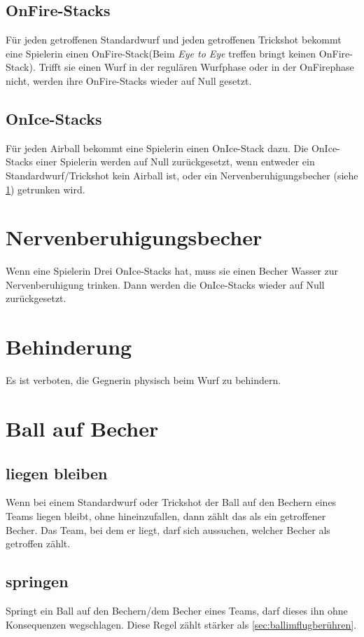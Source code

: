 \documentclass[a5paper, 12pt]{book}
\begin{document}
\subsection{OnFire-Stacks}\label{sub:onfirestacks}
Für jeden getroffenen Standardwurf und jeden getroffenen Trickshot bekommt eine Spielerin einen OnFire-Stack(Beim \textit{ Eye to Eye} treffen bringt keinen OnFire-Stack). Trifft sie einen Wurf in der regulären Wurfphase oder in der OnFirephase nicht, werden ihre OnFire-Stacks wieder auf Null gesetzt.
\subsection{OnIce-Stacks}\label{sub:onicestacks}
Für jeden Airball bekommt eine Spielerin einen OnIce-Stack dazu. Die OnIce-Stacks einer Spielerin werden auf Null zurückgesetzt, wenn entweder ein Standardwurf/Trickshot kein Airball ist, oder ein Nervenberuhigungsbecher (siehe \ref{sec:Nervenberuhigungsbecher}) getrunken wird. 
\section{Nervenberuhigungsbecher}\label{sec:Nervenberuhigungsbecher}
Wenn eine Spielerin Drei OnIce-Stacks hat, muss sie einen Becher Wasser zur Nervenberuhigung trinken. Dann werden die OnIce-Stacks wieder auf Null zurückgesetzt.
\section{Behinderung}\label{sec:behinderung}
Es ist verboten, die Gegnerin physisch beim Wurf zu behindern. 
\section{Ball auf Becher}\label{sec:aufbecher}
\subsection{liegen bleiben}\label{sub:liegenbleiben}
Wenn bei einem Standardwurf oder Trickshot der Ball auf den Bechern eines Teams liegen bleibt, ohne hineinzufallen, dann zählt das als ein getroffener Becher. Das Team, bei dem er liegt, darf sich aussuchen, welcher Becher als getroffen zählt.
\subsection{springen}\label{sub:springen}
Springt ein Ball auf den Bechern/dem Becher eines Teams, darf dieses ihn ohne Konsequenzen wegschlagen. Diese Regel zählt stärker als \ref{sec:ballimflugberühren}.
\appendix
\end{document}
